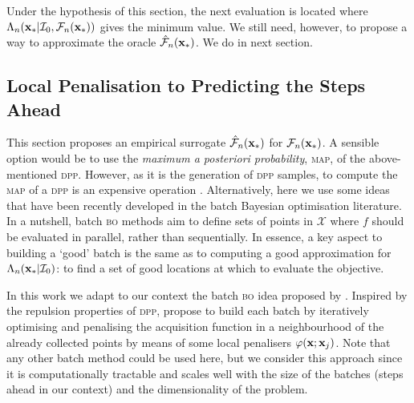\documentclass[twoside]{article}
\newcommand{\I}{\mathcal{I}}
\newcommand{\future}{\mathcal{F}}
\newcommand{\acr}[1]{\textsc{#1}\xspace}
\newcommand{\dpp}{\acr{dpp}}
\newcommand{\map}{\acr{map}}
\newcommand{\bo}{\acr{bo}}
\begin{document}
Under the hypothesis of this section, the next evaluation is located where $\Lambda_n(\latentVector_*|\I_0, \future_{n}(\latentVector_*) )$ gives the minimum value. We still need, however, to propose a way to approximate the oracle $\hat{\future}_n(\latentVector_*)$. We do in next section.

\subsection{Local Penalisation to Predicting the Steps Ahead}










This section proposes an empirical surrogate $\hat{\future}_n(\latentVector_*)$ for $\future_n(\latentVector_*)$. A sensible option would be to use the \emph{maximum a posteriori probability}, \map, of the above-mentioned \dpp. However, as it is the generation of \dpp samples, to compute the \map of a \dpp is an expensive operation \citep{NIPS2012_4577}. Alternatively, here we use some ideas that have been recently developed in the batch Bayesian optimisation literature. In a nutshell, batch \bo methods aim to define sets of points in $\mathcal{X}$ where $f$ should be evaluated in parallel, rather than sequentially. In essence, a key aspect to building a `good' batch is the same as to computing a good approximation for $\Lambda_n(\latentVector_*|\I_0)$: to find a set of good locations at which to evaluate the objective. 

In this work we adapt to our context the batch \bo idea proposed by \cite{gonzalez2015batch}. Inspired by the repulsion properties of \dpp , \cite{gonzalez2015batch} propose to build each batch by iteratively optimising and penalising the acquisition function in a neighbourhood of the   already collected points by means of some local penalisers $\varphi(\mathbf{x};\mathbf{x}_j)$. Note that any other batch method could be used here, but we consider this approach since it is computationally tractable and scales well with the size of the batches (steps ahead in our context) and the dimensionality of the problem.
\end{document}
